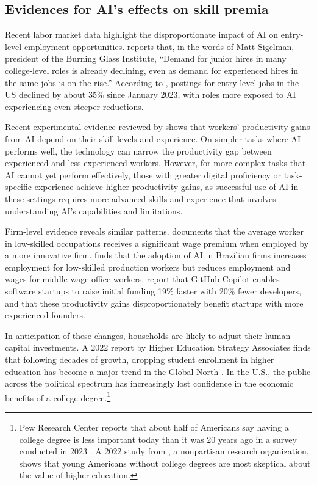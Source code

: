 \documentclass[12pt]{article}
\begin{document}
\subsection{Evidences for AI's effects on skill premia}

Recent labor market data highlight the disproportionate impact of AI on entry-level employment opportunities. \citet{bloomberg2025} reports that, in the words of Matt Sigelman, president of the Burning Glass Institute, ``Demand for junior hires in many college-level roles is already declining, even as demand for experienced hires in the same jobs is on the rise.'' According to \citet{reveliolabs2025}, postings for entry-level jobs in the US declined by about 35\% since January 2023, with roles more exposed to AI experiencing even steeper reductions. 

Recent experimental evidence reviewed by \citet{calvino_effects_2025} shows that workers' productivity gains from AI depend on their skill levels and experience. On simpler tasks where AI performs well, the technology can narrow the productivity gap between experienced and less experienced workers. However, for more complex tasks that AI cannot yet perform effectively, those with greater digital proficiency or task-specific experience achieve higher productivity gains, as successful use of AI in these settings requires more advanced skills and experience that involves understanding AI's capabilities and limitations.

Firm-level evidence reveals similar patterns. \citet{aghion2019} documents that the average worker in low-skilled occupations receives a significant wage premium when employed by a more innovative firm. \citet{de_souza_artificial_2025} finds that the adoption of AI in Brazilian firms increases employment for low-skilled production workers but reduces employment and wages for middle-wage office workers. \citet{asam_generative_2025} report that GitHub Copilot enables software startups to raise initial funding 19\% faster with 20\% fewer developers, and that these productivity gains disproportionately benefit startups with more experienced founders.

In anticipation of these changes, households are likely to adjust their human capital investments.
A 2022 report by Higher Education Strategy Associates finds that following decades of growth, dropping student enrollment in higher education has become a major trend in the Global North \cite{hesa2022}. In the U.S., the public across the political spectrum has increasingly lost confidence in the economic benefits of a college degree.\footnote{Pew Research Center reports that about half of Americans say having a college degree is less important today than it was 20 years ago in a survey conducted in 2023 \cite{pew2024}. A 2022 study from \citet{publicagenda2022}, a nonpartisan research organization, shows that young Americans without college degrees are most skeptical about the value of higher education.} 
\end{document}
